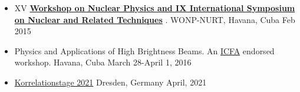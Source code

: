 \documentclass[10pt]{article}
\renewcommand{\section}[1]{\pagebreak[3]%
	\hyphenpenalty=10000%
	\vspace{1.3\baselineskip}%
	\phantomsection\addcontentsline{toc}{section}{#1}%
	\noindent\llap{\scshape\smash{\parbox[t]{\marginparwidth}{\raggedright #1}}}%
\vspace{-\baselineskip}\par}
\newenvironment{innerlist}[1][\enskip\textbullet]%
{\begin{itemize}[#1,leftmargin=*,parsep=0pt,itemsep=0pt,topsep=0pt,partopsep=0pt]}
{\end{itemize}}
\newcommand{\halfblankline}{\quad\vspace{-0.5\baselineskip}\pagebreak[3]}
\begin{document}
	\begin{innerlist}
	\item XV \href{http://www.wonp-nurt.cu}{\textbf{Workshop on Nuclear Physics and
		IX International Symposium on Nuclear and Related Techniques}} .
		WONP-NURT, Havana, Cuba \hfill Feb 2015
	\item Physics and Applications of High Brightness Beams. An
		\href{icfa.fnal.gov}{ICFA} endorsed workshop. Havana, Cuba  \hfill
		March 28-April 1, 2016
	\item \href{https://www.pks.mpg.de/korrel21}{Korrelationstage 2021} Dresden, Germany  \hfill
		April, 2021
	\end{innerlist}





\end{document}
